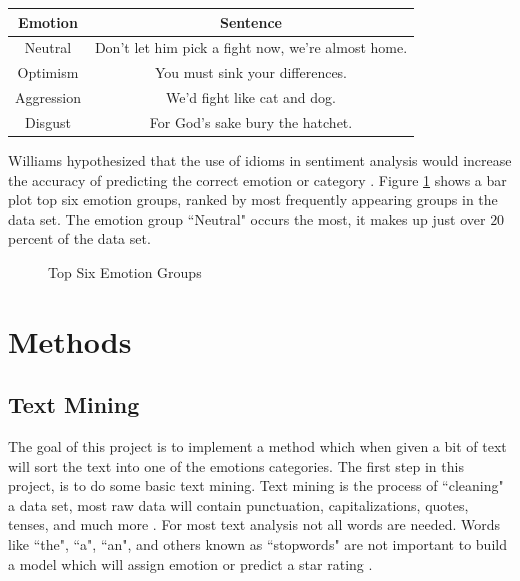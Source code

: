 \documentclass[titlepage,letterpaper]{article}
\begin{document}
 \begin{center}
 	\begin{tabular}{ |c|c| } 
 		\hline
 		Emotion & Sentence \\
 		\hline \hline
 		Neutral & Don't let him pick a fight now, we're almost home. \\
 		\hline
 		Optimism &  You must sink your differences. \\
 		\hline
 		Aggression & We'd fight like cat and dog.  \\ 
 		\hline
 		Disgust & For God's sake bury the hatchet. \\
 		\hline
 	\end{tabular}
 	\label{PrimaryEmotionTable}
 \end{center}

 
 Williams hypothesized that the use of idioms in sentiment analysis would increase the accuracy of predicting the correct emotion or category \cite{lowriwilliams}. Figure \ref{topsixgroups} shows a bar plot top six emotion groups, ranked by most frequently appearing groups in the data set. The emotion group ``Neutral" occurs the most, it makes up just over $20$ percent of the data set. 
 
 
% 
 \begin{figure}[htb]
 		\centering
 		\resizebox{4in}{!}{}
 		\caption{Top Six Emotion Groups}\label{topsixgroups}
 \end{figure}
 	
 
\section{Methods}

\subsection{Text Mining}
The goal of this project is to implement a method which when given a bit of text will sort the text into one of the emotions categories. The first step in this project, is to do some basic text mining. Text mining is the process of ``cleaning" a data set, most raw data will contain punctuation, capitalizations, quotes, tenses, and much more \cite{TextMining}. For most text analysis not all words are needed. Words like ``the", ``a", ``an", and others known as ``stopwords" are not important to build a model which will assign emotion or predict a star rating \cite{TextMining}. 
\end{document}
